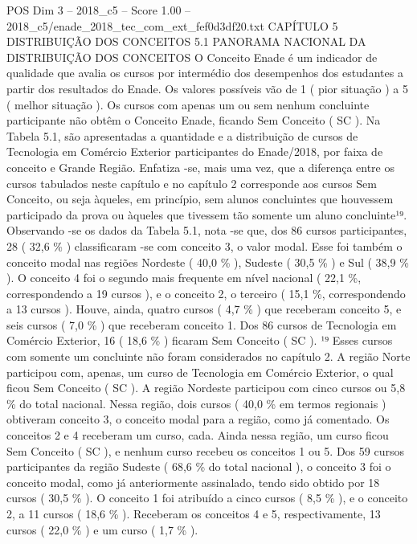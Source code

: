 \begin{textsample}{POS Dim 3 – 2018\_c5 – Score 1.00 – 2018\_c5/enade\_2018\_tec\_com\_ext\_fef0d3df20.txt}  \label{ex:f3_pos_184}
CAPÍTULO 5 DISTRIBUIÇÃO DOS CONCEITOS 5.1 PANORAMA NACIONAL DA DISTRIBUIÇÃO DOS CONCEITOS O Conceito Enade é um indicador de qualidade que avalia os cursos por intermédio dos desempenhos dos estudantes a partir dos resultados do Enade.
Os valores possíveis vão de 1 ( pior situação ) a 5 ( melhor situação ).
Os cursos com apenas um ou sem nenhum concluinte participante não obtêm o Conceito Enade, ficando Sem Conceito ( SC ).
Na Tabela 5.1, são apresentadas a quantidade e a distribuição de cursos de Tecnologia em Comércio Exterior participantes do Enade/2018, por faixa de conceito e Grande Região.
Enfatiza -se, mais uma vez, que a diferença entre os cursos tabulados neste capítulo e no capítulo 2 corresponde aos cursos Sem Conceito, ou seja àqueles, em princípio, sem alunos concluintes que houvessem participado da prova ou àqueles que tivessem tão somente um aluno concluinte¹⁹.
Observando -se os dados da Tabela 5.1, nota -se que, dos 86 cursos participantes, 28 ( 32,6 \% ) classificaram -se com conceito 3, o valor modal.
Esse foi também o conceito modal nas regiões Nordeste ( 40,0 \% ), Sudeste ( 30,5 \% ) e Sul ( 38,9 \% ).
O conceito 4 foi o segundo mais frequente em nível nacional ( 22,1 \%, correspondendo a 19 cursos ), e o conceito 2, o terceiro ( 15,1 \%, correspondendo a 13 cursos ).
Houve, ainda, quatro cursos ( 4,7 \% ) que receberam conceito 5, e seis cursos ( 7,0 \% ) que receberam conceito 1.
Dos 86 cursos de Tecnologia em Comércio Exterior, 16 ( 18,6 \% ) ficaram Sem Conceito ( SC ). ¹⁹ Esses cursos com somente um concluinte não foram considerados no capítulo 2.
A região Norte participou com, apenas, um curso de Tecnologia em Comércio Exterior, o qual ficou Sem Conceito ( SC ).
A região Nordeste participou com cinco cursos ou 5,8 \% do total nacional.
Nessa região, dois cursos ( 40,0 \% em termos regionais ) obtiveram conceito 3, o conceito modal para a região, como já comentado.
Os conceitos 2 e 4 receberam um curso, cada.
Ainda nessa região, um curso ficou Sem Conceito ( SC ), e nenhum curso recebeu os conceitos 1 ou 5.
Dos 59 cursos participantes da região Sudeste ( 68,6 \% do total nacional ), o conceito 3 foi o conceito modal, como já anteriormente assinalado, tendo sido obtido por 18 cursos ( 30,5 \% ).
O conceito 1 foi atribuído a cinco cursos ( 8,5 \% ), e o conceito 2, a 11 cursos ( 18,6 \% ).
Receberam os conceitos 4 e 5, respectivamente, 13 cursos ( 22,0 \% ) e um curso ( 1,7 \% ).

\end{textsample}
